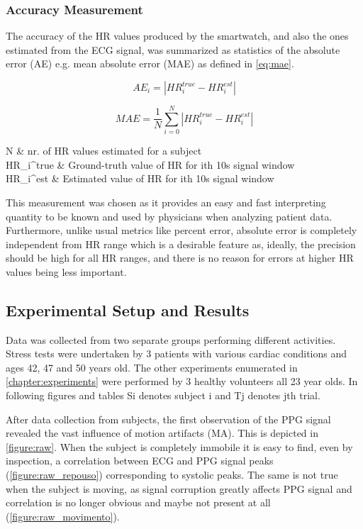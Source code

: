 \subsubsection{Accuracy Measurement}

The accuracy of the HR values produced by the smartwatch, and also  the ones estimated from the ECG signal, was summarized as statistics of the absolute error (AE) e.g. mean absolute error (MAE) as defined in \cref{eq:mae}.

\begin{equation}
AE_i = \left|{HR}_i^{true} - {HR}_i^{est}\right|
\label{eq:ae}
\end{equation}

\begin{equation}
MAE = \frac{1}{N}\sum_{i=0}^{N}\left|{HR}_i^{true} - {HR}_i^{est}\right|
\label{eq:mae}
\end{equation}

\begin{conditions}
	N     & nr. of HR values estimated for a subject \\
	{HR}_i^{true} 	& Ground-truth value of HR for ith 10s signal window \\
	{HR}_i^{est}    & Estimated value of HR for ith 10s signal window \\   
\end{conditions}

This measurement was chosen as it provides an easy and fast interpreting quantity to be known and used by physicians when analyzing patient data. Furthermore, unlike usual metrics like percent error, absolute error is completely independent from HR range which is a desirable feature as, ideally, the precision should be high for all HR ranges, and there is no reason for errors at higher HR values being less important.

\FloatBarrier
\subsection{Experimental Setup and Results}

Data was collected from two separate groups performing different activities. Stress tests were undertaken by 3 patients with various cardiac conditions and ages 42, 47 and 50 years old. The other experiments enumerated in \cref{chapter:experiments} were performed by 3 healthy volunteers all 23 year olds. In following figures and tables Si denotes subject i and Tj denotes jth trial.

After data collection from subjects, the first observation of the PPG signal revealed the vast influence of motion artifacts (MA). This is depicted in \cref{figure:raw}. When the subject is completely immobile it is easy to find, even by inspection, a correlation between ECG and PPG signal peaks (\cref{figure:raw_repouso}) corresponding to systolic peaks. The same is not true when the subject is moving, as signal corruption greatly affects PPG signal and correlation is no longer obvious and maybe not present at all (\cref{figure:raw_movimento}).


